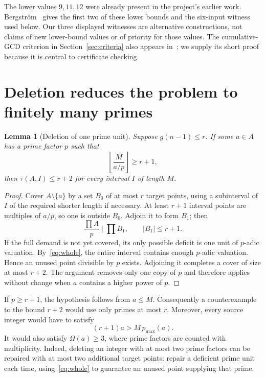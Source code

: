 \documentclass[11pt,a4paper]{article}
\newtheorem{lemma}[theorem]{Lemma}
\begin{document}
The lower values $9,11,12$ were already present in the project's earlier work. Bergstr\"om~\cite{bergstrom} gives the first two of these lower bounds and the six-input witness used below. Our three displayed witnesses are alternative constructions, not claims of new lower-bound values or of priority for those values. The cumulative-GCD criterion in Section~\ref{sec:criteria} also appears in~\cite{bergstrom}; we supply its short proof because it is central to certificate checking.

\section{Deletion reduces the problem to finitely many primes}
\begin{lemma}[Deletion of one prime unit]\label{lem:deletion}
Suppose $g(n-1)\le r$. If some $a\in A$ has a prime factor $p$ such that
\[
 \left\lfloor\frac{M}{a/p}\right\rfloor\ge r+1,
\]
then $\tau(A,I)\le r+2$ for every interval $I$ of length $M$.
\end{lemma}
\begin{proof}
Cover $A\setminus\{a\}$ by a set $B_0$ of at most $r$ target points, using a subinterval of $I$ of the required shorter length if necessary. At least $r+1$ interval points are multiples of $a/p$, so one is outside $B_0$. Adjoin it to form $B_1$; then
\[
 \frac{\prod A}{p}\mid\prod B_1,\qquad |B_1|\le r+1.
\]
If the full demand is not yet covered, its only possible deficit is one unit of $p$-adic valuation. By~\eqref{eq:whole}, the entire interval contains enough $p$-adic valuation. Hence an unused point divisible by $p$ exists. Adjoining it completes a cover of size at most $r+2$. The argument removes only one copy of $p$ and therefore applies without change when $a$ contains a higher power of $p$.
\end{proof}

If $p\ge r+1$, the hypothesis follows from $a\le M$. Consequently a counterexample to the bound $r+2$ would use only primes at most $r$. Moreover, every source integer would have to satisfy
\begin{equation}\label{eq:eligible}
 (r+1)a>M\,p_{\max}(a).
\end{equation}
It would also satisfy $\Omega(a)\ge3$, where prime factors are counted with multiplicity. Indeed, deleting an integer with at most two prime factors can be repaired with at most two additional target points: repair a deficient prime unit each time, using~\eqref{eq:whole} to guarantee an unused point supplying that prime.
\end{document}
